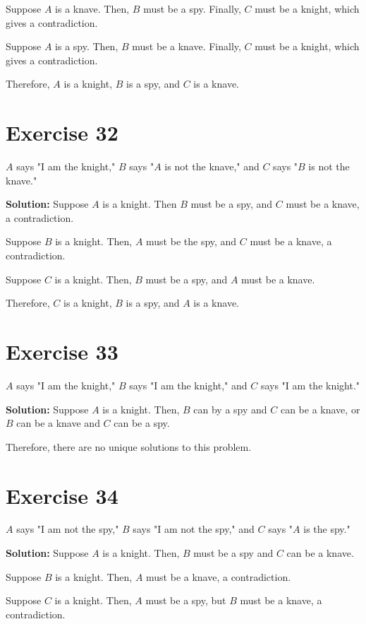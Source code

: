 \documentclass{Axon}
\begin{document}
Suppose \(A\) is a knave. Then, \(B\) must be a spy. Finally, \(C\) must be a knight, which gives a contradiction.

Suppose \(A\) is a spy. Then, \(B\) must be a knave. Finally, \(C\) must be a knight, which gives a contradiction.

Therefore, \(A\) is a knight, \(B\) is a spy, and \(C\) is a knave.

\section*{Exercise 32}
\(A\) says "I am the knight," \(B\) says "\(A\) is not the knave," and \(C\) says "\(B\) is not the knave."

\noindent
\textbf{Solution:}
Suppose \(A\) is a knight. Then \(B\) must be a spy, and \(C\) must be a knave, a contradiction.

Suppose \(B\) is a knight. Then, \(A\) must be the spy, and \(C\) must be a knave, a contradiction.

Suppose \(C\) is a knight. Then, \(B\) must be a spy, and \(A\) must be a knave.

Therefore, \(C\) is a knight, \(B\) is a spy, and \(A\) is a knave.

\section*{Exercise 33}
\(A\) says "I am the knight," \(B\) says "I am the knight," and \(C\) says "I am the knight."

\noindent
\textbf{Solution:}
Suppose \(A\) is a knight. Then, \(B\) can by a spy and \(C\) can be a knave, or \(B\) can be a knave and \(C\) can be a spy.

Therefore, there are no unique solutions to this problem.

\section*{Exercise 34}
\(A\) says "I am not the spy," \(B\) says "I am not the spy," and \(C\) says "\(A\) is the spy."

\noindent
\textbf{Solution:}
Suppose \(A\) is a knight. Then, \(B\) must be a spy and \(C\) can be a knave.

Suppose \(B\) is a knight. Then, \(A\) must be a knave, a contradiction.

Suppose \(C\) is a  knight. Then, \(A\) must be a spy, but \(B\) must be a knave, a contradiction.
\end{document}
